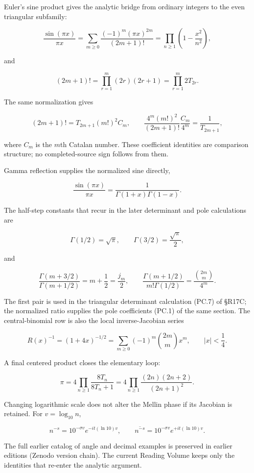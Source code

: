 \documentclass[
  11pt,
]{book}
\begin{document}
Euler's sine product gives the analytic bridge from ordinary integers to
the even triangular subfamily:

\[
\frac{\sin(\pi x)}{\pi x}
=\sum_{m\ge0}\frac{(-1)^m(\pi x)^{2m}}{(2m+1)!}
=\prod_{n\ge1}\left(1-\frac{x^2}{n^2}\right),
\tag{PR.5}
\]

and

\[
\boxed{(2m+1)!=\prod_{r=1}^{m}(2r)(2r+1)
=\prod_{r=1}^{m}2T_{2r}.}
\tag{PR.6}
\]

The same normalization gives

\[
(2m+1)!=T_{2m+1}(m!)^2C_m,
\qquad
\frac{4^m(m!)^2}{(2m+1)!}\frac{C_m}{4^m}
=\frac1{T_{2m+1}},
\tag{PR.7a}
\]

where \(C_m\) is the \(m\)th Catalan number. These coefficient
identities are comparison structure; no completed-source sign follows
from them.

Gamma reflection supplies the normalized sine directly,

\[
\frac{\sin(\pi x)}{\pi x}
=\frac1{\Gamma(1+x)\Gamma(1-x)}.
\tag{PR.8}
\]

The half-step constants that recur in the later determinant and pole
calculations are

\[
\boxed{\Gamma(1/2)=\sqrt\pi,\qquad
\Gamma(3/2)=\frac{\sqrt\pi}{2},}
\tag{PR.10a}
\]

and

\[
\boxed{\frac{\Gamma(m+3/2)}{\Gamma(m+1/2)}
=m+\frac12=\frac{j_m}{2},\qquad
\frac{\Gamma(m+1/2)}{m!\Gamma(1/2)}
=\frac{\binom{2m}{m}}{4^m}.}
\tag{PR.10b}
\]

The first pair is used in the triangular determinant calculation (PC.7)
of §R17C; the normalized ratio supplies the pole coefficients (PC.1) of
the same section. The central-binomial row is also the local
inverse-Jacobian series

\[
R(x)^{-1}=(1+4x)^{-1/2}
=\sum_{m\ge0}(-1)^m\binom{2m}{m}x^m,
\qquad |x|<\frac14.
\tag{PR.10c}
\]

A final centered product closes the elementary loop:

\[
\boxed{\pi=4\prod_{n\ge1}\frac{8T_n}{8T_n+1}
=4\prod_{n\ge1}\frac{(2n)(2n+2)}{(2n+1)^2}.}
\tag{PR.10d}
\]

Changing logarithmic scale does not alter the Mellin phase if its
Jacobian is retained. For \(v=\log_{10}n\),

\[
n^{-s}=10^{-\sigma v}e^{-it(\ln10)v},\qquad
\overline{n^{-s}}=10^{-\sigma v}e^{+it(\ln10)v}.
\tag{PR.11}
\]

The full earlier catalog of angle and decimal examples is preserved in
earlier editions (Zenodo version chain). The current Reading Volume
keeps only the identities that re-enter the analytic argument.
\end{document}
